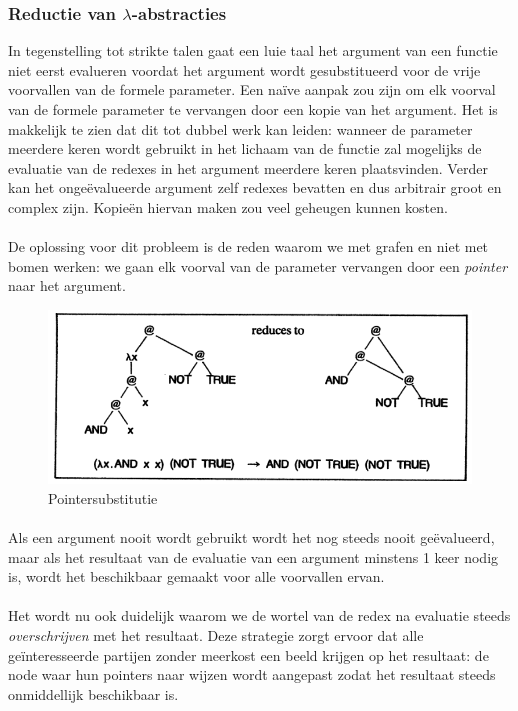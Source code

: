 \documentclass[a4paper,10pt]{article}
\begin{document}
\subsubsection{Reductie van $\lambda$-abstracties}
In tegenstelling tot strikte talen gaat een luie taal het argument van een functie niet eerst evalueren voordat het argument wordt gesubstitueerd voor de vrije voorvallen van de formele parameter.
Een na{\"i}ve aanpak zou zijn om elk voorval van de formele parameter te vervangen door een kopie van het argument.
Het is makkelijk te zien dat dit tot dubbel werk kan leiden: wanneer de parameter meerdere keren wordt gebruikt in het lichaam van de functie zal mogelijks de evaluatie van de redexes in het argument meerdere keren plaatsvinden.
Verder kan het onge{\"e}valueerde argument zelf redexes bevatten en dus arbitrair groot en complex zijn.
Kopie{\"e}n hiervan maken zou veel geheugen kunnen kosten.
\paragraph{}
De oplossing voor dit probleem is de reden waarom we met grafen en niet met bomen werken: we gaan elk voorval van de parameter vervangen door een \emph{pointer} naar het argument.

\begin{figure}[h]
  \caption{Pointersubstitutie}
  \includegraphics[width=\linewidth]{images/slpj208}
\end{figure}

\paragraph{}
Als een argument nooit wordt gebruikt wordt het nog steeds nooit ge{\"e}valueerd, maar als het resultaat van de evaluatie van een argument minstens 1 keer nodig is, wordt het beschikbaar gemaakt voor alle voorvallen ervan.
\paragraph{}
Het wordt nu ook duidelijk waarom we de wortel van de redex na evaluatie steeds \emph{overschrijven} met het resultaat.
Deze strategie zorgt ervoor dat alle ge{\"i}nteresseerde partijen zonder meerkost een beeld krijgen op het resultaat: de node waar hun pointers naar wijzen wordt aangepast zodat het resultaat steeds onmiddellijk beschikbaar is.
\end{document}
